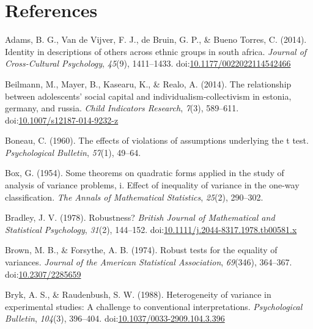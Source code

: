\documentclass[man,floatsintext]{apa6}
\begin{document}
\newpage

\hypertarget{references}{%
\section{References}\label{references}}

\setlength{\parindent}{-0.5in}
\setlength{\leftskip}{0.5in}

\hypertarget{refs}{}
\leavevmode\hypertarget{ref-Adams_et_al_2014}{}%
Adams, B. G., Van de Vijver, F. J., de Bruin, G. P., \& Bueno Torres, C. (2014). Identity in descriptions of others across ethnic groups in south africa. \emph{Journal of Cross-Cultural Psychology}, \emph{45}(9), 1411--1433. doi:\href{https://doi.org/10.1177/0022022114542466}{10.1177/0022022114542466}

\leavevmode\hypertarget{ref-Beilmann_et_al_2014}{}%
Beilmann, M., Mayer, B., Kasearu, K., \& Realo, A. (2014). The relationship between adolescents' social capital and individualism-collectivism in estonia, germany, and russia. \emph{Child Indicators Research}, \emph{7}(3), 589--611. doi:\href{https://doi.org/10.1007/s12187-014-9232-z}{10.1007/s12187-014-9232-z}

\leavevmode\hypertarget{ref-Boneau_1960}{}%
Boneau, C. (1960). The effects of violations of assumptions underlying the t test. \emph{Psychological Bulletin}, \emph{57}(1), 49--64.

\leavevmode\hypertarget{ref-Box_1954}{}%
Box, G. (1954). Some theorems on quadratic forms applied in the study of analysis of variance problems, i. Effect of inequality of variance in the one-way classification. \emph{The Annals of Mathematical Statistics}, \emph{25}(2), 290--302.

\leavevmode\hypertarget{ref-Bradley_1978}{}%
Bradley, J. V. (1978). Robustness? \emph{British Journal of Mathematical and Statistical Psychology}, \emph{31}(2), 144--152. doi:\href{https://doi.org/10.1111/j.2044-8317.1978.tb00581.x}{10.1111/j.2044-8317.1978.tb00581.x}

\leavevmode\hypertarget{ref-Brown_and_Forsythe_1974}{}%
Brown, M. B., \& Forsythe, A. B. (1974). Robust tests for the equality of variances. \emph{Journal of the American Statistical Association}, \emph{69}(346), 364--367. doi:\href{https://doi.org/10.2307/2285659}{10.2307/2285659}

\leavevmode\hypertarget{ref-Bryk_and_Raudenbush_1988}{}%
Bryk, A. S., \& Raudenbush, S. W. (1988). Heterogeneity of variance in experimental studies: A challenge to conventional interpretations. \emph{Psychological Bulletin}, \emph{104}(3), 396--404. doi:\href{https://doi.org/10.1037/0033-2909.104.3.396}{10.1037/0033-2909.104.3.396}
\end{document}

